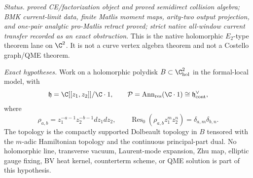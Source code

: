 \begin{stmt}\label{thm:lane-native-holomorphic-e2-bm}
  \emph{Status.} \emph{proved CE/factorization object and proved
  semidirect collision algebra; BMK current-limit data, finite Matlis
  moment maps, arity-two output projection, and one-pair analytic
  pro-Matlis retract proved; strict native all-window current transfer
  recorded as an exact obstruction}.  This is the native
  holomorphic \(E_2\)-type theorem lane on \(\C^2\).  It is not a curve
  vertex algebra theorem and not a Costello graph/QME theorem.

  \emph{Exact hypotheses.} Work on a holomorphic polydisk
  \(B\subset\C^2_{\mathrm{hol}}\) in the formal-local model, with
  \[
    \mathfrak h=\C[[z_1,z_2]]/\C\cdot1,\qquad
    \mathcal P=\operatorname{Ann}_{\mathrm{res}}(\C\cdot1)
    \cong\mathfrak h^\vee_{\mathrm{cont}},
  \]
  where
  \[
    \rho_{a,b}=z_1^{-a-1}z_2^{-b-1}dz_1dz_2,\qquad
    \operatorname{Res}_0(\rho_{a,b}z_1^mz_2^n)
      =\delta_{a,m}\delta_{b,n}.
  \]
  The topology is the compactly supported Dolbeault topology in \(B\)
  tensored with the \(m\)-adic Hamiltonian topology and the continuous
  principal-part dual.  No holomorphic line, transverse vacuum,
  Laurent-mode expansion, Zhu map, elliptic gauge fixing, BV heat kernel,
  counterterm scheme, or QME solution is part of this hypothesis.


\end{stmt}
